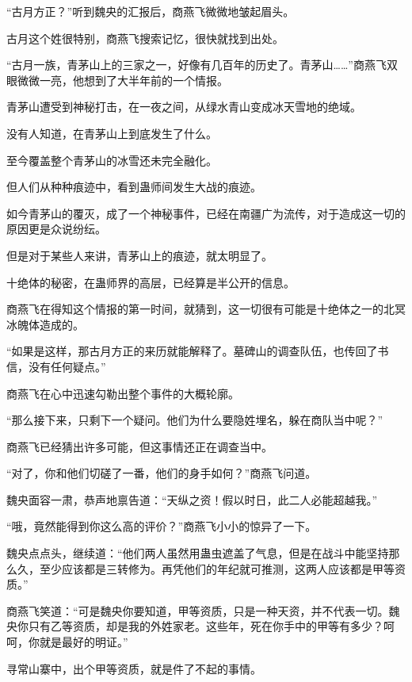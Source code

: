 
\begin{this_body}

“古月方正？”听到魏央的汇报后，商燕飞微微地皱起眉头。

古月这个姓很特别，商燕飞搜索记忆，很快就找到出处。

“古月一族，青茅山上的三家之一，好像有几百年的历史了。青茅山……”商燕飞双眼微微一亮，他想到了大半年前的一个情报。

青茅山遭受到神秘打击，在一夜之间，从绿水青山变成冰天雪地的绝域。

没有人知道，在青茅山上到底发生了什么。

至今覆盖整个青茅山的冰雪还未完全融化。

但人们从种种痕迹中，看到蛊师间发生大战的痕迹。

如今青茅山的覆灭，成了一个神秘事件，已经在南疆广为流传，对于造成这一切的原因更是众说纷纭。

但是对于某些人来讲，青茅山上的痕迹，就太明显了。

十绝体的秘密，在蛊师界的高层，已经算是半公开的信息。

商燕飞在得知这个情报的第一时间，就猜到，这一切很有可能是十绝体之一的北冥冰魄体造成的。

“如果是这样，那古月方正的来历就能解释了。墓碑山的调查队伍，也传回了书信，没有任何疑点。”

商燕飞在心中迅速勾勒出整个事件的大概轮廓。

“那么接下来，只剩下一个疑问。他们为什么要隐姓埋名，躲在商队当中呢？”

商燕飞已经猜出许多可能，但这事情还正在调查当中。

“对了，你和他们切磋了一番，他们的身手如何？”商燕飞问道。

魏央面容一肃，恭声地禀告道：“天纵之资！假以时日，此二人必能超越我。”

“哦，竟然能得到你这么高的评价？”商燕飞小小的惊异了一下。

魏央点点头，继续道：“他们两人虽然用蛊虫遮盖了气息，但是在战斗中能坚持那么久，至少应该都是三转修为。再凭他们的年纪就可推测，这两人应该都是甲等资质。”

商燕飞笑道：“可是魏央你要知道，甲等资质，只是一种天资，并不代表一切。魏央你只有乙等资质，却是我的外姓家老。这些年，死在你手中的甲等有多少？呵呵，你就是最好的明证。”

寻常山寨中，出个甲等资质，就是件了不起的事情。


\end{this_body}
